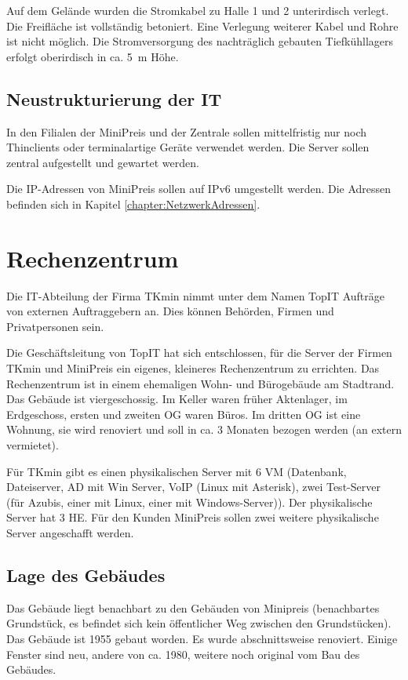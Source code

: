 \documentclass[a4paper,10pt]{scrreprt}
\begin{document}
Auf dem Gelände wurden die Stromkabel zu Halle 1 und 2 unterirdisch verlegt. Die Freifläche ist vollständig betoniert. Eine Verlegung weiterer Kabel und Rohre ist nicht möglich. Die Stromversorgung des nachträglich gebauten Tiefkühllagers erfolgt oberirdisch in ca. 5\, m Höhe.

\section{Neustrukturierung der IT}
In den Filialen der MiniPreis und der Zentrale sollen mittelfristig nur noch Thinclients oder terminalartige Geräte verwendet werden. Die Server sollen zentral aufgestellt und gewartet werden.

Die IP-Adressen von MiniPreis sollen auf IPv6 umgestellt werden. Die Adressen befinden sich in Kapitel \ref{chapter:NetzwerkAdressen}.

\chapter{Rechenzentrum}
Die IT-Abteilung der Firma TKmin nimmt unter dem Namen TopIT Aufträge von externen Auftraggebern an. Dies können Behörden, Firmen und Privatpersonen sein.

Die Geschäftsleitung von TopIT hat sich entschlossen, für die Server der Firmen TKmin und MiniPreis ein eigenes, kleineres Rechenzentrum zu errichten. Das Rechenzentrum ist in einem ehemaligen Wohn- und Bürogebäude am Stadtrand. Das Gebäude ist viergeschossig. Im Keller waren früher Aktenlager, im Erdgeschoss, ersten und zweiten OG waren Büros. Im dritten OG ist eine Wohnung, sie wird renoviert und soll in ca. 3 Monaten bezogen werden (an extern vermietet).

Für TKmin gibt es einen physikalischen Server mit 6 VM (Datenbank, Dateiserver, AD mit Win Server, VoIP (Linux mit Asterisk), zwei Test-Server (für Azubis, einer mit Linux, einer mit Windows-Server)). Der physikalische Server hat 3 HE. Für den Kunden MiniPreis sollen zwei weitere physikalische Server angeschafft werden.

\section{Lage des Gebäudes}
Das Gebäude liegt benachbart zu den Gebäuden von Minipreis (benachbartes Grundstück, es befindet sich kein öffentlicher Weg zwischen den Grundstücken). Das Gebäude ist 1955 gebaut worden. Es wurde abschnittsweise renoviert. Einige Fenster sind neu, andere von ca. 1980, weitere noch original vom Bau des Gebäudes.
\end{document}
